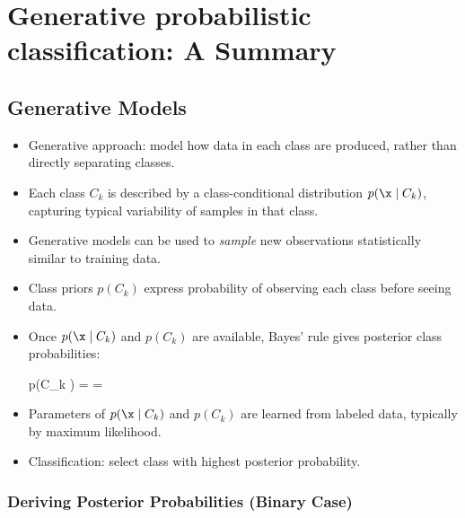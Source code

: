 
\chapter{Generative probabilistic classification: A Summary}

\section*{Generative Models}

\begin{itemize}
    \item \alert{Generative approach}: model how data in each class are produced, rather than directly separating classes.
    \item Each class $C_k$ is described by a \alert{class-conditional distribution} $p(\x \mid C_k)$, capturing typical variability of samples in that class.
    \item Generative models can be used to \emph{sample} new observations statistically similar to training data.
    \item \alert{Class priors} $p(C_k)$ express probability of observing each class before seeing data.
    \item Once $p(\x \mid C_k)$ and $p(C_k)$ are available, Bayes' rule gives \alert{posterior} class probabilities:
    \begin{myequation}
    p(C_k \mid \x) =  = 
    \end{myequation}
    \item Parameters of $p(\x \mid C_k)$ and $p(C_k)$ are learned from labeled data, typically by maximum likelihood.
    \item Classification: select class with highest posterior probability.
\end{itemize}

\subsection*{Deriving Posterior Probabilities (Binary Case)}

